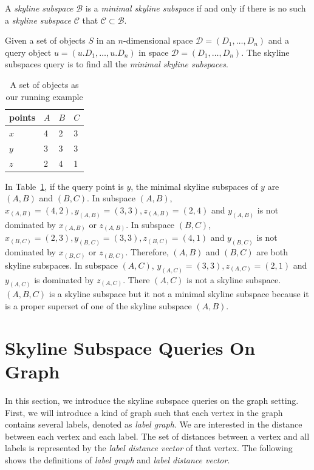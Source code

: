 \begin{definition}
A \emph{skyline subspace} $\mathcal{B}$ is a \emph{minimal skyline subspace} if and only if there is no such a \emph{skyline subspace} $\mathcal{C}$ that $\mathcal{C} \subset \mathcal{B}$.
\end{definition}

\begin{definition}
Given a set of objects $S$ in an $n$-dimensional space $\mathcal{D} = (D_1,\dots,D_n)$ and a query object $u = (u.D_1,\dots,u.D_n)$ in space $\mathcal{D} = (D_1,\dots,D_n)$. The skyline subspaces query is to find all the \emph{minimal skyline subspaces}.
\end{definition}

\begin{table}[h]
    \centering
    \begin{tabular}{|l|l|l|l|}
    \hline
    points & $A$ & $B$ & $C$ \\ \hline
    $x$      & 4 & 2 & 3 \\ \hline
    $y$      & 3 & 3 & 3 \\ \hline
    $z$      & 2 & 4 & 1 \\ \hline
    \end{tabular}
    \caption{\label{tab:objects_example} A set of objects as our running example }
\end{table}

In Table~\ref{tab:objects_example}, if the query point is $y$, the minimal skyline subspaces of $y$ are $(A, B)$ and $(B, C)$. In subspace $(A, B)$, $x_{(A, B)} = (4, 2), y_{(A, B)} = (3, 3), z_{(A, B)} = (2, 4)$ and $y_{(A, B)}$ is not dominated by $x_{(A, B)}$ or $z_{(A, B)}$. 
In subspace $(B, C)$, $x_{(B, C)} = (2, 3), y_{(B, C)} = (3, 3), z_{(B, C)} = (4, 1)$ and $y_{(B, C)}$ is not dominated by $x_{(B, C)}$ or $z_{(B, C)}$. Therefore, $(A, B)$ and $(B, C)$ are both skyline subspaces. 
In subspace $(A, C)$, $y_{(A, C)} = (3, 3), z_{(A, C)} = (2, 1)$ and $y_{(A, C)}$ is dominated by $z_{(A, C)}$. There $(A, C)$ is not a skyline subspace. 
$(A, B, C)$ is a skyline subspace but it not a minimal skyline subspace because it is a proper superset of one of the skyline subspace $(A, B)$.

\section{Skyline Subspace Queries On Graph}
In this section, we introduce the skyline subspace queries on the graph setting. First, we will introduce a kind of graph such that each vertex in the graph contains several labels, denoted as \emph{label graph}. We are interested in the distance between each vertex and each label. The set of distances between a vertex and all labels is represented by the \emph{label distance vector} of that vertex. The following shows the definitions of \emph{label graph} and \emph{label distance vector}.

